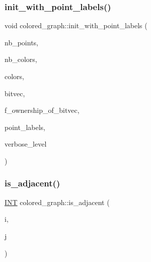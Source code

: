 \mbox{\label{classcolored__graph_a988d41f23300407c71570cb7ea06e593}} 
\subsubsection{\texorpdfstring{init\+\_\+with\+\_\+point\+\_\+labels()}{init\_with\_point\_labels()}}
{\footnotesize\ttfamily void colored\+\_\+graph\+::init\+\_\+with\+\_\+point\+\_\+labels (\begin{DoxyParamCaption}\item[{\mbox{\hyperlink{galois_8h_a09fddde158a3a20bd2dcadb609de11dc}{I\+NT}}}]{nb\+\_\+points,  }\item[{\mbox{\hyperlink{galois_8h_a09fddde158a3a20bd2dcadb609de11dc}{I\+NT}}}]{nb\+\_\+colors,  }\item[{\mbox{\hyperlink{galois_8h_a09fddde158a3a20bd2dcadb609de11dc}{I\+NT}} $\ast$}]{colors,  }\item[{\mbox{\hyperlink{galois_8h_a122c4acf389c050379f00341fdcd5812}{U\+B\+Y\+TE}} $\ast$}]{bitvec,  }\item[{\mbox{\hyperlink{galois_8h_a09fddde158a3a20bd2dcadb609de11dc}{I\+NT}}}]{f\+\_\+ownership\+\_\+of\+\_\+bitvec,  }\item[{\mbox{\hyperlink{galois_8h_a09fddde158a3a20bd2dcadb609de11dc}{I\+NT}} $\ast$}]{point\+\_\+labels,  }\item[{\mbox{\hyperlink{galois_8h_a09fddde158a3a20bd2dcadb609de11dc}{I\+NT}}}]{verbose\+\_\+level }\end{DoxyParamCaption})}

\mbox{\label{classcolored__graph_ac13cc7a798c3ee11bef01f01c8eab061}} 
\subsubsection{\texorpdfstring{is\+\_\+adjacent()}{is\_adjacent()}}
{\footnotesize\ttfamily \mbox{\hyperlink{galois_8h_a09fddde158a3a20bd2dcadb609de11dc}{I\+NT}} colored\+\_\+graph\+::is\+\_\+adjacent (\begin{DoxyParamCaption}\item[{\mbox{\hyperlink{galois_8h_a09fddde158a3a20bd2dcadb609de11dc}{I\+NT}}}]{i,  }\item[{\mbox{\hyperlink{galois_8h_a09fddde158a3a20bd2dcadb609de11dc}{I\+NT}}}]{j }\end{DoxyParamCaption})}

